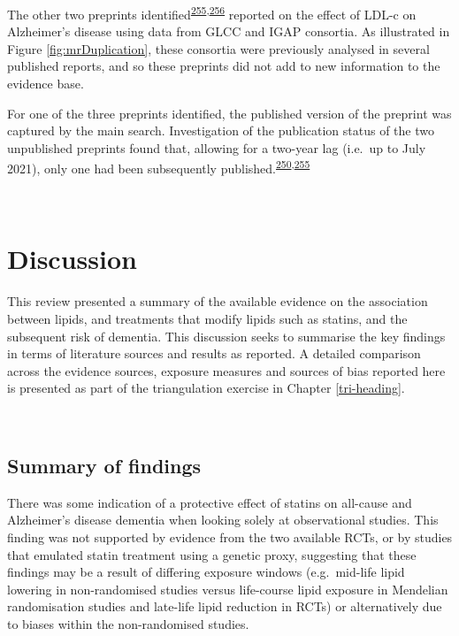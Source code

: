 \documentclass[a4paper, twoside]{templates/ociamthesis}
\begin{document}
The other two preprints identified\textsuperscript{\protect\hyperlink{ref-andrews2019}{255},\protect\hyperlink{ref-zhu2017}{256}} reported on the effect of LDL-c on Alzheimer's disease using data from GLCC and IGAP consortia. As illustrated in Figure \ref{fig:mrDuplication}, these consortia were previously analysed in several published reports, and so these preprints did not add to new information to the evidence base.

For one of the three preprints identified, the published version of the preprint was captured by the main search. Investigation of the publication status of the two unpublished preprints found that, allowing for a two-year lag (i.e.~up to July 2021), only one had been subsequently published.\textsuperscript{\protect\hyperlink{ref-andrews2021}{250},\protect\hyperlink{ref-andrews2019}{255}}

~

\hypertarget{discussion-1}{%
\section{Discussion}\label{discussion-1}}

This review presented a summary of the available evidence on the association between lipids, and treatments that modify lipids such as statins, and the subsequent risk of dementia. This discussion seeks to summarise the key findings in terms of literature sources and results as reported. A detailed comparison across the evidence sources, exposure measures and sources of bias reported here is presented as part of the triangulation exercise in Chapter \ref{tri-heading}.

~

\hypertarget{summary-of-findings}{%
\subsection{Summary of findings}\label{summary-of-findings}}

There was some indication of a protective effect of statins on all-cause and Alzheimer's disease dementia when looking solely at observational studies. This finding was not supported by evidence from the two available RCTs, or by studies that emulated statin treatment using a genetic proxy, suggesting that these findings may be a result of differing exposure windows (e.g.~mid-life lipid lowering in non-randomised studies versus life-course lipid exposure in Mendelian randomisation studies and late-life lipid reduction in RCTs) or alternatively due to biases within the non-randomised studies.
\end{document}

